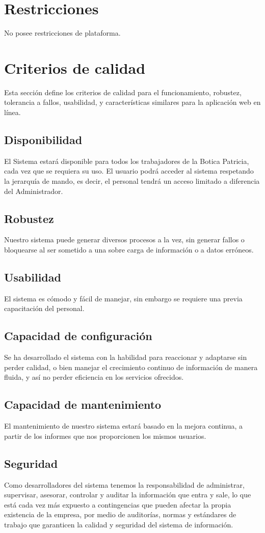\documentclass[a4paper,11pt, spanish]{report}
\begin{document}
{{{{{    \section{Restricciones}
      No posee restricciones de plataforma.
    \section{Criterios de calidad}
      Esta sección define los criterios de calidad para el funcionamiento, robustez, tolerancia a fallos, usabilidad, y características similares para la aplicación web en línea.
      \subsection{Disponibilidad}
        El Sistema estará disponible para todos los trabajadores de la Botica Patricia, cada vez que se requiera su uso. El usuario podrá acceder al sistema respetando la jerarquía de mando, es decir, el personal tendrá un acceso limitado a diferencia del Administrador.
      \subsection{Robustez}
        Nuestro sistema puede generar diversos procesos a la vez, sin generar fallos o bloquearse al ser sometido a una sobre carga de información o a datos erróneos.
      \subsection{Usabilidad}
        El sistema es cómodo y fácil de manejar, sin embargo se requiere una previa capacitación del personal.
      \subsection{Capacidad de configuración}
        Se ha desarrollado el sistema con la habilidad para reaccionar y adaptarse sin perder calidad, o bien manejar el crecimiento continuo de información de manera fluida, y así no perder eficiencia en los servicios ofrecidos.
      \subsection{Capacidad de mantenimiento}
      El mantenimiento de nuestro sistema estará basado en la mejora continua, a partir de los informes que nos proporcionen los mismos usuarios.
      \subsection{Seguridad}
      Como desarrolladores del sistema tenemos la responsabilidad de administrar, supervisar, asesorar, controlar y auditar la información que entra y sale, lo que está cada vez más expuesto a contingencias que pueden afectar la propia existencia de la empresa, por medio de auditorías, normas y estándares de trabajo que garanticen la calidad y seguridad del  sistema de información.

}}}}}
\end{document}
